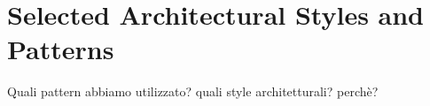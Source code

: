 \documentclass[../../../../dd.tex]{subfiles}
\begin{document}
	\section{Selected Architectural Styles and Patterns}
		Quali pattern abbiamo utilizzato? quali style architetturali? perchè?
	
\end{document}
